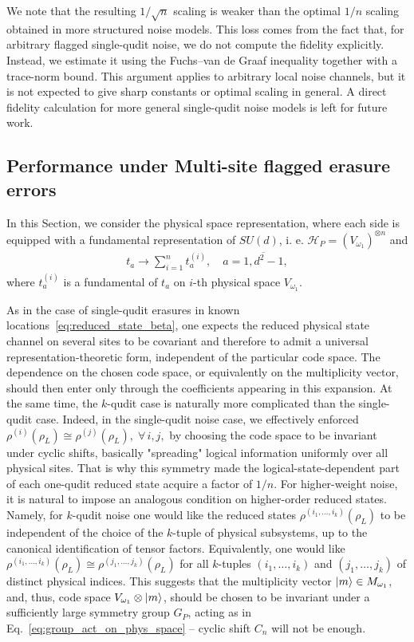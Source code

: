 \documentclass[10pt,twocolumn,superscriptaddress,aps,amsmath,amssymb,citeautoscript,floatfix,prx,longbibliography]{revtex4-2}
\theoremstyle{plain}
\theoremstyle{plain}
\theoremstyle{plain}
\theoremstyle{plain}
\theoremstyle{plain}
\theoremstyle{plain}
\begin{document}
We note that the resulting \(1/\sqrt n\) scaling is weaker than the optimal \(1/n\) scaling obtained in more structured noise models. This loss comes from the fact that, for arbitrary flagged single-qudit noise, we do not compute the fidelity explicitly. Instead, we estimate it using the Fuchs--van de Graaf inequality together with a trace-norm bound. This argument applies to arbitrary local noise channels, but it is not expected to give sharp constants or optimal scaling in general. A direct fidelity calculation for more general single-qudit noise models is left for future work.

\subsection{Performance under Multi-site flagged erasure errors}\label{subsec:main_muti_erasure_noise}

In this Section, we consider the physical space representation, where each side is equipped with a fundamental representation of $SU(d)$, i. e. $\mathcal{H}_P=(V_{\omega_1})^{\otimes n}$ and
\begin{equation}
    \begin{gathered}
    t_a \rightarrow \sum_{i=1}^n t_a^{(i)}, \quad a=\overline{1, d^2-1},
    \end{gathered}
\end{equation} 
where $t_a^{(i)}$ is a fundamental of $t_a$ on $i$-th physical space $V_{\omega_1}$.

As in the case of single-qudit erasures in known locations~\eqref{eq:reduced_state_beta}, one expects the reduced physical state channel on several sites to be covariant and therefore to admit a universal representation-theoretic form, independent of the particular code space. The dependence on the chosen code space, or equivalently on the multiplicity vector, should then enter only through the coefficients appearing in this expansion. At the same time, the $k$-qudit case is naturally more complicated than the single-qudit case. Indeed, in the single-qudit noise case, we effectively enforced
$
    \rho^{(i)}(\rho_L)\cong \rho^{(j)}(\rho_L),\;
    \forall\, i,j,
$
by choosing the code space to be invariant under cyclic shifts, basically "spreading" logical information uniformly over all physical sites. That is why this symmetry made the logical-state-dependent part of each one-qudit reduced state acquire a factor of \(1/n\). 
For higher-weight noise, it is natural to impose an analogous condition on higher-order reduced states. Namely, for \(k\)-qudit noise one would like the reduced states
$
    \rho^{(i_1,\ldots,i_k)}(\rho_L)
$
to be independent of the choice of the \(k\)-tuple of physical subsystems, up to the canonical identification of tensor factors. Equivalently, one would like
$
    \rho^{(i_1,\ldots,i_k)}(\rho_L)
    \cong
    \rho^{(j_1,\ldots,j_k)}(\rho_L)
$
for all \(k\)-tuples \((i_1,\ldots,i_k)\) and \((j_1,\ldots,j_k)\) of distinct physical indices.
This suggests that the multiplicity vector $\ket{m}\in M_{\omega_{1}}$, and, thus, code space $V_{\omega_1}\otimes \ket{m}$, should be chosen to be invariant under a sufficiently large symmetry group $G_P$, acting as in Eq.~\eqref{eq:group_act_on_phys_space} -- cyclic shift $C_n$ will not be enough. 
\end{document}
